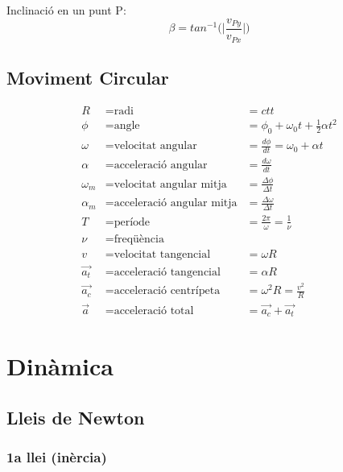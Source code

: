 Inclinació en un punt P:
\begin{equation}\label{eqi:Inclinacio tir parabolic}
    \beta = tan^{-1}\bigg(\bigg|\frac{v_{Py}}{v_{Px}}\bigg|\bigg)
\end{equation}

\subsection{Moviment Circular}
\label{sub:moviment_circular}

\begin{align*}
    R &= \text{radi} &= ctt \\
    \phi &= \text{angle} &= \phi_0 + \omega_0 t + \frac{1}{2} \alpha t^2 \\
    \omega &= \text{velocitat angular} &= \frac{d\phi}{dt} =  \omega_0 + \alpha t \\
    \alpha &= \text{acceleració angular} &= \frac{d\omega}{dt} \\
    \omega_m &= \text{velocitat angular mitja} &= \frac{\Delta \phi}{\Delta t} \\
    \alpha_m &= \text{acceleració angular mitja} &= \frac{\Delta \omega}{\Delta t} \\
    T &= \text{període} &= \frac{2\pi}{\omega} = \frac{1}{\nu}\\
    \nu &= \text{freqüència} \\
    v &= \text{velocitat tangencial} &= \omega  R \\
    \vec{a_t} &= \text{acceleració tangencial} &= \alpha  R \\
    \vec{a_c} &= \text{acceleració centrípeta} &= \omega^2R = \frac{v^2}{R} \\
    \vec{a} &= \text{acceleració total} &= \vec{a_c} + \vec{a_t}
\end{align*}

\section{Dinàmica}
\label{sec:dinamica}

\subsection{Lleis de Newton}
\label{sub:lleis_de_newton}

\subsubsection{1a llei (inèrcia)}
\label{ssub:1a_llei}

